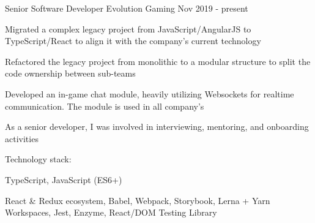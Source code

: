 

\begin{cventries}


  \cventry
    {Senior Software Developer} %
    {Evolution Gaming} %
    {} %
    {Nov 2019 - present} %
    {
      \begin{cvitems}
        \item Migrated a complex legacy project from JavaScript/AngularJS to TypeScript/React to align it with the company's current technology
        \item Refactored the legacy project from monolithic to a modular structure to split the code ownership between sub-teams
        \item Developed an in-game chat module, heavily utilizing Websockets for realtime communication. The module is used in all company's
        \item As a senior developer, I was involved in interviewing, mentoring, and onboarding activities
      \end{cvitems}
      \vspace{5mm}
      Technology stack:
      \begin{cvstackitems}
        \item TypeScript, JavaScript (ES6+)
        \item React \& Redux ecosystem, Babel, Webpack, Storybook, Lerna + Yarn Workspaces, Jest, Enzyme, React/DOM Testing Library
      \end{cvstackitems}
      \vspace{-4.0mm}
    }


\end{cventries}
